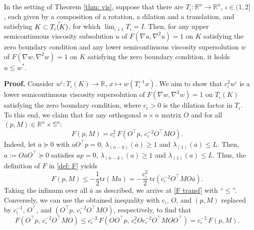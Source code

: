 \documentclass[11pt]{amsart}
\numberwithin{equation}{section}
\newcommand{\rr}{\mathbb{R}}
\begin{document}
\begin{thm} \label{thm: comparison}
In the setting of Theorem \ref{thm: vis}, suppose that there are $T_\iota\!:\rr^n\to\rr^n$, $\iota\in(1,2]$, each given by a composition of a rotation, a dilation and a translation, and satisfying $K\subset \accentset{\circ}{T_\iota(K)}$, for which $\lim_{\iota\downarrow1} T_\iota=I$. Then, for any upper semicontinuous viscosity subsolution $u$ of $F(\nabla u,\nabla^2u)=1$ on $K$ satisfying the zero boundary condition and any lower semicontinuous viscosity supersolution $w$ of $F(\nabla w,\nabla^2w)=1$ on $K$ satisfying the zero boundary condition, it holds $u\le w^*$.
\end{thm} 

\noindent\textbf{Proof.} Consider $w^\iota\!:T_\iota(K)\to\rr$, $x\mapsto w(T_\iota^{-1}x)$. We aim to show that $c_\iota^2 w^\iota$ is a lower semicontinuous viscosity supersolution of $F(\nabla w,\nabla^2w)=1$ on $T_\iota(K)$ satisfying the zero boundary condition, where $c_\iota>0$ is the dilation factor in $T_\iota$. To this end, we claim that for any orthogonal $n\times n$ matrix $O$ and for all $(p,M)\in\rr^n\times\mathbb{S}^n$: 
\begin{equation} \label{F transf}
F(p, M) = c_\iota^2\, F(O^\top p,\, c_\iota^{-2} O^{\top} M O).
\end{equation}
Indeed, let $\overline{a}\succeq 0$ with $\overline{a}O^\top p=0$,
$\lambda_{(n-k)}(\overline{a})\geq 1$ and $\lambda_{(1)}(\overline{a})\leq L$. Then, $a:=O\overline{a}O^\top\succeq0$ satisfies $ap=0$, $\lambda_{(n-k)}(a)\geq 1$ and $\lambda_{(1)}(a)\leq L$. Thus, the definition of $F$ in \eqref{def: F} yields
\begin{equation} \label{F transf ineq}
F(p, M) \le - \frac{1}{2} \mathrm{tr}(Ma) = - \frac{c_\iota^2}{2}\,\mathrm{tr}(c_\iota^{-2}O^\top M O\overline{a}).
\end{equation}
Taking the infimum over all $\overline{a}$ as described, we arrive at \eqref{F transf} with ``$\le$''. Conversely, we can use the obtained inequality with $c_\iota$, $O$, and $(p,M)$ replaced by $c_\iota^{-1}$, $O^\top$, and $(O^{\top} p,\, c_\iota^{-2} O^{\top} M O)$, respectively, to find that
\begin{equation}
F(O^{\top} p,\, c_\iota^{-2} O^{\top} M O) 
\le c_\iota^{-2}\, F(O O^{\top} p,\, 
c_\iota^2 Oc_\iota^{-2} O^{\top} M O O^\top)=c_\iota^{-2}\, F(p, M).
\end{equation}

\smallskip
\end{document}
